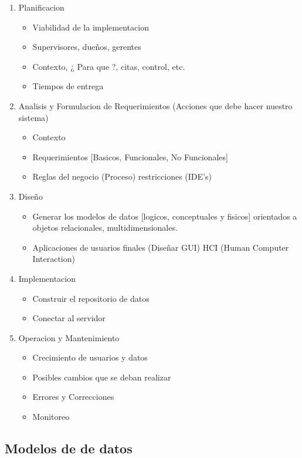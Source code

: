 \documentclass[twoside]{article}
\begin{document}
\begin{enumerate}
  \item Planificacion
  \begin{itemize}
    \item Viabilidad de la implementacion
    \item Supervisores, dueños, gerentes
    \item Contexto, ¿ Para que ?, citas, control, etc.
    \item Tiempos de entrega
  \end{itemize}
  \item Analisis y Formulacion de Requerimientos (Acciones que debe hacer nuestro sistema)
  \begin{itemize}
    \item Contexto
    \item Requerimientos [Basicos, Funcionales, No Funcionales]
    \item Reglas del negocio (Proceso) \rightarrow restricciones (IDE's)
  \end{itemize}
  \item {Diseño}
  \begin{itemize}
    \item Generar los modelos de datos [logicos, conceptuales y fisicos] orientados a objetos relacionales, multidimensionales.
    \item Aplicaciones de usuarios finales (Diseñar GUI) \rightarrow HCI (Human Computer Interaction)
  \end{itemize}
  \item Implementacion
  \begin{itemize}
    \item Construir el repositorio de datos
    \item Conectar al servidor
  \end{itemize}
  \item Operacion y Mantenimiento
  \begin{itemize}
    \item Crecimiento de usuarios y datos
    \item Posibles cambios que se deban realizar
    \item Errores y Correcciones
    \item Monitoreo
  \end{itemize}
\end{enumerate}

\subsection{Modelos de de datos}
\end{document}
